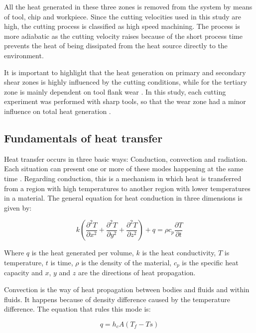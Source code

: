 	All the heat generated in these three zones is removed from the system by means of tool, chip and workpiece. Since the cutting velocities used in this study are high, the cutting process is classified as high speed machining. The process is more adiabatic as the cutting velocity raises because of the short process time prevents the heat of being dissipated from the heat source directly to the environment. 

	It is important to highlight that the heat generation on primary and secondary shear zones is highly influenced by the cutting conditions, while for the tertiary zone is mainly dependent on tool flank wear \cite{abukhshim2006heat}. In this study, each cutting experiment was performed with sharp tools, so that the wear zone had a minor influence on total heat generation \cite{shaw2005metal}.

	\subsection{Fundamentals of heat transfer}

	Heat transfer occurs in three basic ways: Conduction, convection and radiation. Each situation can present one or more of these modes happening at the same time \cite{poole1989fundamentals}. Regarding conduction, this is a mechanism in which heat is transferred from a region with high temperatures to another region with lower temperatures in a material. The general equation for heat conduction in three dimensions is given by:

	\begin{equation} 
	\label{}
	k(\frac{\partial ^{2}T}{\partial x^{2}} + \frac{\partial ^{2}T}{\partial y^{2}} + \frac{\partial ^{2}T}{\partial z^{2}}) + q = \rho c_{p}\frac{\partial T}{\partial t}
	\end{equation}

	Where $q$ is the heat generated per volume, $k$ is the heat conductivity, $T$ is temperature, $t$ is time, $\rho$ is the density of the material, $c_{p}$ is the specific heat capacity and $x$, $y$ and $z$ are the directions of heat propagation.

	Convection is the way of heat propagation between bodies and fluids and within fluids. It happens because of density difference caused by the temperature difference. The equation that rules this mode is:

	\begin{equation} 
	\label{}
	q = h_{c}A(T_{f} - T{s})
	\end{equation}

